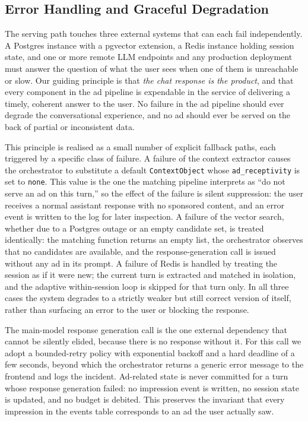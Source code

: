 \subsection{Error Handling and Graceful Degradation}
\label{subsec:error-handling}

The serving path touches three external systems that can each fail
independently. A Postgres instance with a pgvector extension, a
Redis instance holding session state, and one or more remote LLM
endpoints and any production deployment must answer the question
of what the user sees when one of them is unreachable or slow. Our
guiding principle is that \emph{the chat response is the product},
and that every component in the ad pipeline is expendable in the
service of delivering a timely, coherent answer to the user. No
failure in the ad pipeline should ever degrade the conversational
experience, and no ad should ever be served on the back of partial or
inconsistent data.

This principle is realised as a small number of explicit fallback
paths, each triggered by a specific class of failure. A failure of the
context extractor causes the orchestrator to substitute a
default \texttt{ContextObject} whose \texttt{ad\_receptivity} is set
to \texttt{none}. This value is the one the matching pipeline
interprets as ``do not serve an ad on this turn,'' so the effect of
the failure is silent suppression: the user receives a normal
assistant response with no sponsored content, and an error event is
written to the log for later inspection. A failure of the vector
search, whether due to a Postgres outage or an empty candidate set,
is treated identically: the matching function returns an empty list,
the orchestrator observes that no candidates are available, and the
response-generation call is issued without any ad in its prompt. A
failure of Redis is handled by treating the session as if it were
new; the current turn is extracted and matched in isolation, and the
adaptive within-session loop is skipped for that turn only. In all
three cases the system degrades to a strictly weaker but still
correct version of itself, rather than surfacing an error to the
user or blocking the response.

The main-model response generation call is the one external
dependency that cannot be silently elided, because there is no
response without it. For this call we adopt a bounded-retry policy
with exponential backoff and a hard deadline of a few seconds,
beyond which the orchestrator returns a generic error message to the
frontend and logs the incident. Ad-related state is never committed
for a turn whose response generation failed: no impression event is
written, no session state is updated, and no budget is debited.
This preserves the invariant that every impression in the events
table corresponds to an ad the user actually saw.

